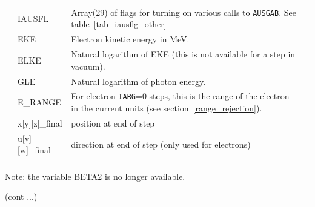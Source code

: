 \begin{table}[htb]
\begin{center}
\begin{tabular}{ l  l   p{105mm}l  |}
           & IAUSFL & Array(29) of flags for turning on
                   various calls to {\tt AUSGAB}. See table~\ref{tab_iausflg_other}\\
           & EKE   & Electron kinetic energy in MeV.\\
           & ELKE  & Natural logarithm of EKE (this is not available for
                     a step in vacuum).\\
           & GLE   & Natural logarithm of photon energy.\\
           & E\_RANGE & For electron {\tt IARG}=0  steps, this is the range of the
electron in the current units (see section~\ref{range_rejection}).\\
           & x[y][z]\_final & position at end of step \\
           & u[v][w]\_final & direction at end of step (only used for electrons)\\
&&\\
\hline
    \end{tabular}
    Note: the variable BETA2 is no longer available.\\
    \end{center}
    \mbox{}\hfill (cont ...)\\
    \end{table}

\clearpage

